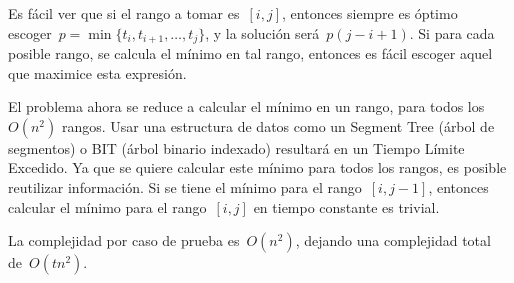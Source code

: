 
Es fácil ver que si el rango a tomar es~$[i, j]$, entonces siempre es óptimo
escoger~$p = \min \{t_i, t_{i + 1}, \dots, t_j\}$, y la solución
será~$p (j - i + 1)$. Si para cada posible rango, se calcula el mínimo en tal rango,
entonces es fácil escoger aquel que maximice esta expresión.

El problema ahora se reduce a calcular el mínimo en un rango, para todos los~$O(n^2)$
rangos. Usar una estructura de datos como un Segment Tree (árbol de segmentos) o BIT
(árbol binario indexado) resultará en un Tiempo Límite Excedido. Ya que se quiere
calcular este mínimo para todos los rangos, es posible reutilizar información. Si se
tiene el mínimo para el rango~$[i, j - 1]$, entonces calcular el mínimo para el
rango~$[i, j]$ en tiempo constante es trivial.

La complejidad por caso de prueba es~$O(n^2)$, dejando una complejidad total
de~$O(tn^2)$.


